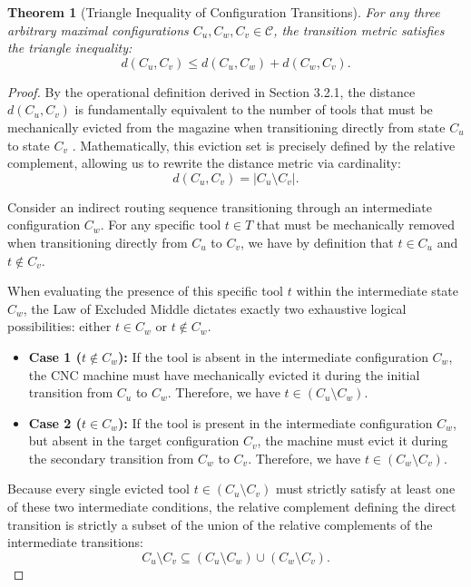\documentclass[11pt, a4paper]{book}
\newtheorem{theorem}{Theorem}[chapter]
\begin{document}
	\begin{theorem}[Triangle Inequality of Configuration Transitions]
		For any three arbitrary maximal configurations $C_u, C_w, C_v \in \mathcal{C}$, the transition metric satisfies the triangle inequality:
		\begin{equation}
			d(C_u, C_v) \le d(C_u, C_w) + d(C_w, C_v).
		\end{equation}
	\end{theorem}
	
	\begin{proof}
		By the operational definition derived in Section 3.2.1, the distance $d(C_u, C_v)$ is fundamentally equivalent to the number of tools that must be mechanically evicted from the magazine when transitioning directly from state $C_u$ to state $C_v$ \cite{Colares2026}. %
		Mathematically, this eviction set is precisely defined by the relative complement, allowing us to rewrite the distance metric via cardinality:
		\begin{equation}
			d(C_u, C_v) = |C_u \setminus C_v|.
		\end{equation}
		
		Consider an indirect routing sequence transitioning through an intermediate configuration $C_w$. For any specific tool $t \in T$ that must be mechanically removed when transitioning directly from $C_u$ to $C_v$, we have by definition that $t \in C_u$ and $t \notin C_v$. 
		
		When evaluating the presence of this specific tool $t$ within the intermediate state $C_w$, the Law of Excluded Middle dictates exactly two exhaustive logical possibilities: either $t \in C_w$ or $t \notin C_w$.
		
		\begin{itemize}
			\item \textbf{Case 1 ($t \notin C_w$):} If the tool is absent in the intermediate configuration $C_w$, the CNC machine must have mechanically evicted it during the initial transition from $C_u$ to $C_w$. Therefore, we have $t \in (C_u \setminus C_w)$.
			\item \textbf{Case 2 ($t \in C_w$):} If the tool is present in the intermediate configuration $C_w$, but absent in the target configuration $C_v$, the machine must evict it during the secondary transition from $C_w$ to $C_v$. Therefore, we have $t \in (C_w \setminus C_v)$.
		\end{itemize}
		
		Because every single evicted tool $t \in (C_u \setminus C_v)$ must strictly satisfy at least one of these two intermediate conditions, the relative complement defining the direct transition is strictly a subset of the union of the relative complements of the intermediate transitions:
		\begin{equation}
			C_u \setminus C_v \subseteq (C_u \setminus C_w) \cup (C_w \setminus C_v).
		\end{equation}
		

\end{proof}
\end{document}
